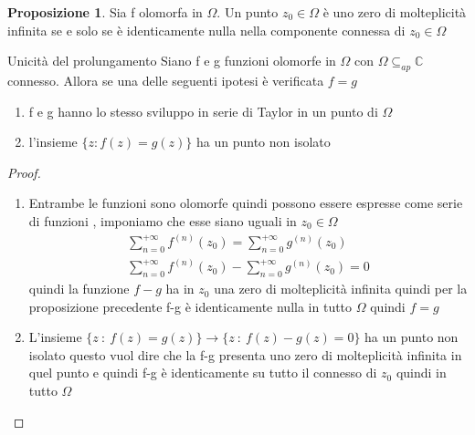 \documentclass{article}
\theoremstyle{definition}
\newtheorem*{proposizione}{Proposizione}
\newcommand{\C}{\mathbb{C}}
\begin{document}
				\begin{proposizione}
					Sia f olomorfa in $\Omega$. Un punto $z_0 \in \Omega$ è uno zero di molteplicità infinita se e solo se è identicamente nulla nella componente connessa di $z_0 \in \Omega$
 				\end{proposizione}
 				\begin{teo}{Unicità del prolungamento}{}
 					Siano f e g funzioni olomorfe in $\Omega$ con $\Omega \subseteq_{ap} \C$ connesso. Allora se una delle seguenti ipotesi è verificata $f=g$
 					\begin{enumerate}
 					\item 	f e g hanno lo stesso sviluppo in serie di Taylor in un punto di $\Omega$
 						\item l'insieme $\{z:f(z)=g(z) \}$ ha un punto non isolato
 					\end{enumerate}
 				\end{teo}
 				\begin{proof}
 \begin{enumerate}
 \item Entrambe le funzioni sono olomorfe quindi possono essere espresse come serie di funzioni , imponiamo che esse siano uguali in $z_0 \in \Omega$ 
 \begin{align*}
	\sum_{n=0}^{+\infty}f^{(n)}(z_0)=	\sum_{n=0}^{+\infty}g^{(n)}(z_0) \\
			\sum_{n=0}^{+\infty}f^{(n)}(z_0)	-\sum_{n=0}^{+\infty}g^{(n)}(z_0) =0
			\end{align*}
 quindi la funzione $f-g$ ha in $z_0$ una zero di molteplicità infinita quindi per la proposizione precedente f-g è identicamente nulla in tutto $\Omega$ quindi $f=g$
 \item L'insieme $\{z\ : \ f(z)=g(z)\} \rightarrow \{z\ :\ f(z)-g(z)=0 \}$ ha un punto non isolato questo vuol dire che la f-g presenta uno zero di molteplicità infinita in quel punto e quindi f-g è identicamente su tutto il connesso di $z_0$ quindi in tutto $\Omega$
 \end{enumerate}
 				\end{proof}
 				\newpage
\end{document}
